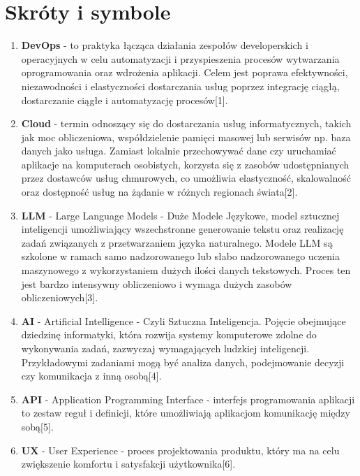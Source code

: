 \section{Skróty i symbole}

 \begin{enumerate}
    \item {\bf DevOps} - to praktyka łącząca działania zespołów developerskich i operacyjnych w celu automatyzacji i przyspieszenia procesów wytwarzania oprogramowania oraz wdrożenia aplikacji. Celem jest poprawa efektywności, niezawodności i elastyczności dostarczania usług poprzez integrację ciągłą, dostarczanie ciągłe i automatyzację procesów[1].
    
    \item {\bf Cloud} - termin odnoszący się do dostarczania usług informatycznych, takich jak moc obliczeniowa, współdzielenie pamięci masowej lub serwisów np. baza danych jako usługa. Zamiast lokalnie przechowywać dane czy uruchamiać aplikacje na komputerach osobistych, korzysta się z zasobów udostępnianych przez dostawców usług chmurowych, co umożliwia elastyczność, skalowalność oraz dostępność usług na żądanie w różnych regionach świata[2].
    
    \item {\bf LLM} - Large Language Models - Duże Modele Językowe, model sztucznej inteligencji umożliwiający wszechstronne generowanie tekstu oraz realizację zadań związanych z przetwarzaniem języka naturalnego. Modele LLM są szkolone w ramach samo nadzorowanego lub słabo nadzorowanego uczenia maszynowego z wykorzystaniem dużych ilości danych tekstowych. Proces ten jest bardzo intensywny obliczeniowo i wymaga dużych zasobów obliczeniowych[3].
    
    \item {\bf AI} - Artificial Intelligence - Czyli Sztuczna Inteligencja. Pojęcie obejmujące dziedzinę informatyki, która rozwija systemy komputerowe zdolne do wykonywania zadań, zazwyczaj wymagających ludzkiej inteligencji. Przykładowymi zadaniami mogą być analiza danych, podejmowanie decyzji czy komunikacja z inną osobą[4].
    
    \item {\bf API} - Application Programming Interface - interfejs programowania aplikacji to zestaw reguł i definicji, które umożliwiają aplikacjom komunikację między sobą[5].
    
    \item {\bf UX} - User Experience - proces projektowania produktu, który ma na celu zwiększenie komfortu i satysfakcji użytkownika[6].
    

\end{enumerate}
